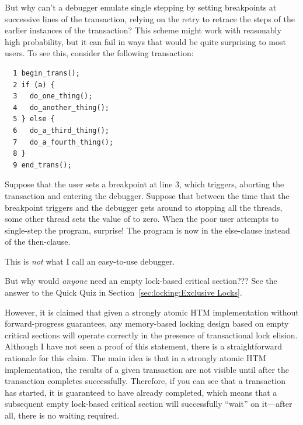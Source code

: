 \begin{enumerate}
\QuickQ{}
	But why can't a debugger emulate single stepping by setting
	breakpoints at successive lines of the transaction, relying
	on the retry to retrace the steps of the earlier instances
	of the transaction?
\QuickA{}
	This scheme might work with reasonably high probability, but it
	can fail in ways that would be quite surprising to most users.
	To see this, consider the following transaction:

	\vspace{5pt}
	\begin{minipage}[t]{\columnwidth}
	\small
\begin{verbatim}
  1 begin_trans();
  2 if (a) {
  3   do_one_thing();
  4   do_another_thing();
  5 } else {
  6   do_a_third_thing();
  7   do_a_fourth_thing();
  8 }
  9 end_trans();
\end{verbatim}
	\end{minipage}
	\vspace{5pt}

	Suppose that the user sets a breakpoint at line 3, which triggers,
	aborting the transaction and entering the debugger.
	Suppose that between the time that the breakpoint triggers
	and the debugger gets around to stopping all the threads, some
	other thread sets the value of  to zero.
	When the poor user attempts to single-step the program, surprise!
	The program is now in the else-clause instead of the then-clause.

	This is \emph{not} what I call an easy-to-use debugger.

\QuickQ{}
	But why would \emph{anyone} need an empty lock-based critical
	section???
\QuickA{}
	See the answer to the Quick Quiz in
	Section~\ref{sec:locking:Exclusive Locks}.

	However, it is claimed that given a strongly atomic HTM
	implementation without forward-progress guarantees, any
	memory-based locking design based on empty critical sections
	will operate correctly in the presence of transactional
	lock elision.
	Although I have not seen a proof of this statement, there
	is a straightforward rationale for this claim.
	The main idea is that in a strongly atomic HTM implementation,
	the results of a given transaction are not visible until
	after the transaction completes successfully.
	Therefore, if you can see that a transaction has started,
	it is guaranteed to have already completed, which means
	that a subsequent empty lock-based critical section will
	successfully ``wait'' on it---after all, there is no waiting
	required.


\end{enumerate}

